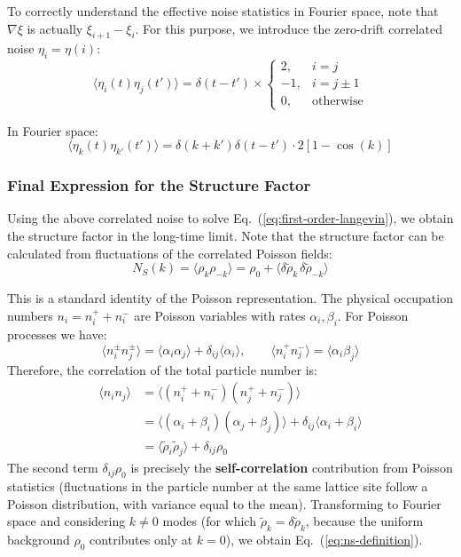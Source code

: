 To correctly understand the effective noise statistics in Fourier space, note that $\nabla\xi$ is actually $\xi_{i+1} - \xi_i$. For this purpose, we introduce the zero-drift correlated noise $\eta_i = \eta(i)$:
\begin{equation}\label{eq:correlated-noise}
\langle \eta_i(t)\eta_j(t') \rangle = \delta(t - t') \times \begin{cases} 2, & i = j \\ -1, & i = j \pm 1 \\ 0, & \text{otherwise} \end{cases}
\end{equation}

In Fourier space:
\begin{equation}\label{eq:noise-fourier}
\langle \eta_k(t)\eta_{k'}(t') \rangle = \delta(k + k')\delta(t - t') \cdot 2[1 - \cos(k)]
\end{equation}

\subsubsection{Final Expression for the Structure Factor}

Using the above correlated noise to solve Eq.~(\ref{eq:first-order-langevin}), we obtain the structure factor in the long-time limit. Note that the structure factor can be calculated from fluctuations of the correlated Poisson fields\cite{bertrand2019}:
\begin{equation}\label{eq:ns-definition}
N_S(k) = \langle \rho_k \rho_{-k} \rangle = \rho_0 + \langle \delta\tilde{\rho}_k \, \delta\tilde{\rho}_{-k} \rangle
\end{equation}

\begin{remark}
This is a standard identity of the Poisson representation. The physical occupation numbers $n_i = n_i^+ + n_i^-$ are Poisson variables with rates $\alpha_i, \beta_i$. For Poisson processes we have:
\[
\langle n_i^\pm n_j^\pm \rangle = \langle \alpha_i \alpha_j \rangle + \delta_{ij}\langle \alpha_i \rangle, \qquad
\langle n_i^+ n_j^- \rangle = \langle \alpha_i \beta_j \rangle
\]
Therefore, the correlation of the total particle number is:
\begin{align*}
\langle n_i n_j \rangle
&= \langle (n_i^+ + n_i^-)(n_j^+ + n_j^-) \rangle \\
&= \langle (\alpha_i + \beta_i)(\alpha_j + \beta_j) \rangle + \delta_{ij}\langle \alpha_i + \beta_i \rangle \\
&= \langle \tilde{\rho}_i \tilde{\rho}_j \rangle + \delta_{ij}\rho_0
\end{align*}
The second term $\delta_{ij}\rho_0$ is precisely the \textbf{self-correlation} contribution from Poisson statistics (fluctuations in the particle number at the same lattice site follow a Poisson distribution, with variance equal to the mean). Transforming to Fourier space and considering $k \neq 0$ modes (for which $\tilde{\rho}_k = \delta\tilde{\rho}_k$, because the uniform background $\rho_0$ contributes only at $k=0$), we obtain Eq.~(\ref{eq:ns-definition}).
\end{remark}


